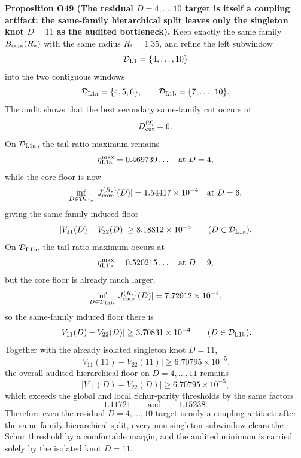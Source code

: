 \documentclass[aps,prd,onecolumn,notitlepage,nofootinbib,superscriptaddress,11pt,floatfix]{revtex4-2}
\begin{document}
\medskip\noindent\textbf{Proposition O49 (The residual \(D=4,\dots,10\) target is itself a coupling artifact: the same-family hierarchical split leaves only the singleton knot \(D=11\) as the audited bottleneck).}
Keep exactly the same family \(B_{\rm core}(R_\ast)\) with the same radius \(R_\ast=1.35\), and refine the left subwindow
\[
\mathcal D_{\rm L1}=\{4,\dots,10\}
\]
into the two contiguous windows
\[
\mathcal D_{\rm L1a}=\{4,5,6\},
\qquad
\mathcal D_{\rm L1b}=\{7,\dots,10\}.
\]
The audit
shows that the best secondary same-family cut occurs at
\[
D_{\rm cut}^{(2)}=6.
\]
On \(\mathcal D_{\rm L1a}\), the tail-ratio maximum remains
\[
\eta_{\rm L1a}^{\max}=0.469739\ldots
\quad\text{at }D=4,
\]
while the core floor is now
\[
\inf_{D\in\mathcal D_{\rm L1a}}|J_{\rm core}^{(R_\ast)}(D)|
=
1.54417\times10^{-4}
\quad\text{at }D=6,
\]
giving the same-family induced floor
\[
|V_{11}(D)-V_{22}(D)|
\ge
8.18812\times10^{-5}
\qquad
(D\in\mathcal D_{\rm L1a}).
\]
On \(\mathcal D_{\rm L1b}\), the tail-ratio maximum occurs at
\[
\eta_{\rm L1b}^{\max}=0.520215\ldots
\quad\text{at }D=9,
\]
but the core floor is already much larger,
\[
\inf_{D\in\mathcal D_{\rm L1b}}|J_{\rm core}^{(R_\ast)}(D)|
=
7.72912\times10^{-4},
\]
so the same-family induced floor there is
\[
|V_{11}(D)-V_{22}(D)|
\ge
3.70831\times10^{-4}
\qquad
(D\in\mathcal D_{\rm L1b}).
\]
Together with the already isolated singleton knot \(D=11\),
\[
|V_{11}(11)-V_{22}(11)|\ge 6.70795\times10^{-5},
\]
the overall audited hierarchical floor on \(D=4,\dots,11\) remains
\[
|V_{11}(D)-V_{22}(D)|
\ge
6.70795\times10^{-5},
\]
which exceeds the global and local Schur-parity thresholds by the same factors
\[
1.11721
\qquad\text{and}\qquad
1.15238.
\]
Therefore even the residual \(D=4,\dots,10\) target is only a coupling artifact: after the same-family hierarchical split, every non-singleton subwindow clears the Schur threshold by a comfortable margin, and the audited minimum is carried solely by the isolated knot \(D=11\).
\end{document}

